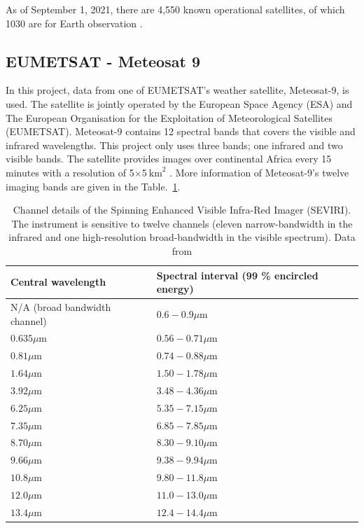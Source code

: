 As of September 1, 2021, there are 4,550 known operational satellites, of which 1030 are for Earth observation \cite{Sat_Data}. 


\subsection{EUMETSAT - Meteosat 9}


In this project, data from one of EUMETSAT's weather satellite, Meteosat-9, is used. The satellite is jointly operated by the European Space Agency (ESA) and The European Organisation for the Exploitation of Meteorological Satellites (EUMETSAT). Meteosat-9 contains 12 spectral bands that covers the visible and infrared wavelengths. This project only uses three bands; one infrared and two visible bands. The satellite provides images over continental Africa every 15 minutes with a resolution of 5$\times$5$\mathrm{~km}^{2}$ \cite{Meteosat9}. More information of Meteosat-9's twelve imaging bands are given in the Table.~\ref{Table1}.

\begin{table}[H]
\centering
\begin{tabular}{|l|l|}
\hline \textbf{Central wavelength} & \textbf{Spectral interval (99 \% encircled energy)} \\
\hline N/A (broad bandwidth channel) &
$0.6-0.9 \mu \mathrm{m}$ \\
\hline $0.635 \mu \mathrm{m}$ & $0.56-0.71 \mu \mathrm{m}$ \\
\hline $0.81 \mu \mathrm{m}$ & $0.74-0.88 \mu \mathrm{m}$ \\
\hline $1.64 \mu \mathrm{m}$ & $1.50-1.78 \mu \mathrm{m}$ \\
\hline $3.92 \mu \mathrm{m}$ & $3.48-4.36 \mu \mathrm{m}$ \\
\hline $6.25 \mu \mathrm{m}$ & $5.35-7.15 \mu \mathrm{m}$ \\
\hline $7.35 \mu \mathrm{m}$ & $6.85-7.85 \mu \mathrm{m}$ \\
\hline $8.70 \mu \mathrm{m}$ & $8.30-9.10 \mu \mathrm{m}$ \\
\hline $9.66 \mu \mathrm{m}$ & $9.38-9.94 \mu \mathrm{m}$ \\
\hline $10.8 \mu \mathrm{m}$ & $9.80-11.8 \mu \mathrm{m}$ \\
\hline $12.0 \mu \mathrm{m}$ & $11.0-13.0 \mu \mathrm{m}$ \\
\hline $13.4 \mu \mathrm{m}$ & $12.4-14.4 \mu \mathrm{m}$ \\
\hline
\end{tabular}
\caption{\label{tab:Table1} Channel details of the Spinning Enhanced Visible Infra-Red Imager (SEVIRI). The instrument is sensitive to twelve channels (eleven narrow-bandwidth in the infrared and one high-resolution broad-bandwidth in the visible spectrum). Data from \cite{Table1}}
\label{Table1}
\end{table}



